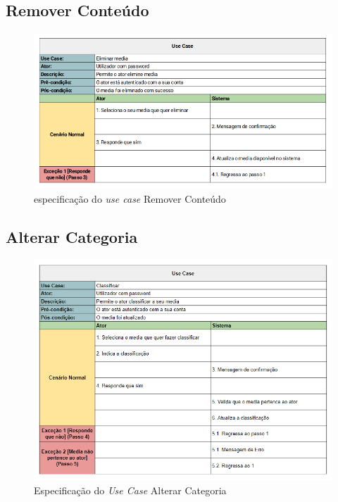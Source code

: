 \documentclass[a4paper]{report}
\begin{document}
\subsection{Remover Conteúdo}
\begin{figure}[H]
	\centering 
    \includegraphics[width=\textwidth]{images/Eliminar_media.png}  
    \caption{especificação do \emph{use case} Remover Conteúdo}
\end{figure}

\subsection{Alterar Categoria}
\begin{figure}[H]
	\centering 
    \includegraphics[width=\textwidth]{images/Classificar.png}  
    \caption{Especificação do \emph{Use Case} Alterar Categoria}
\end{figure}
\end{document}

